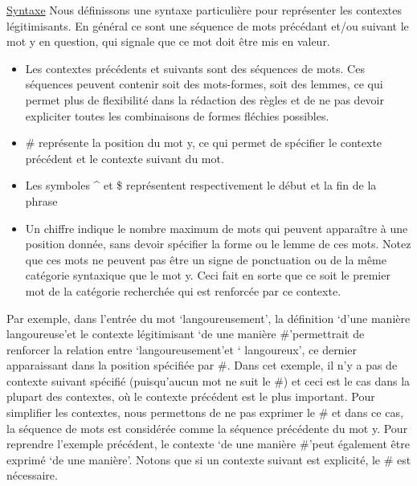 \documentclass[a4paper, 12pt]{article}
\begin{document}
\underline{Syntaxe}\newline
Nous définissons une syntaxe particulière pour représenter les contextes 
légitimisants. En général ce sont une séquence de mots précédant et/ou suivant 
le mot y en question, qui signale que ce mot doit être mis en valeur.\newline

\begin{itemize}
    \item{Les contextes précédents et suivants sont des séquences de mots. Ces 
    séquences peuvent contenir soit des mots-formes, soit des lemmes, ce qui 
    permet plus de flexibilité dans la rédaction des règles et de ne pas devoir 
    expliciter toutes les combinaisons de formes fléchies possibles.}

    \item{\# représente la position du mot y, ce qui permet de spécifier le 
    contexte précédent et le contexte suivant du mot.}

    \item{Les symboles \string^ et \$ représentent respectivement le début et 
    la fin de la phrase}

    \item{Un chiffre indique le nombre maximum de mots qui peuvent apparaître à 
    une position donnée, sans devoir spécifier la forme ou le lemme de ces mots. 
    Notez que ces mots ne peuvent pas être un signe de ponctuation ou de la 
    même catégorie syntaxique que le mot y. Ceci fait en sorte que ce soit 
    le premier mot de la catégorie recherchée qui est renforcée par ce 
    contexte.}

\end{itemize}

Par exemple, dans l'entrée du mot \lq{langoureusement}\rq, la définition 
\lq{d'une manière langoureuse}\rq et le contexte légitimisant \lq{de une manière 
\#}\rq permettrait de renforcer la relation entre \lq langoureusement\rq et \lq 
langoureux\rq, ce dernier apparaissant dans la position spécifiée par \#. Dans 
cet exemple, il n'y a pas de contexte suivant spécifié (puisqu'aucun mot ne suit 
le \#) et ceci est le cas dans la plupart des contextes, où le contexte 
précédent est le plus important. Pour simplifier les contextes, nous permettons 
de ne pas exprimer le \# et dans ce cas, la séquence de mots est considérée 
comme la séquence précédente du mot y. Pour reprendre l'exemple précédent, le 
contexte \lq{de une manière \#}\rq peut également être exprimé \lq{de une 
manière}\rq. Notons que si un contexte suivant est explicité, le \# est 
nécessaire.
\end{document}
